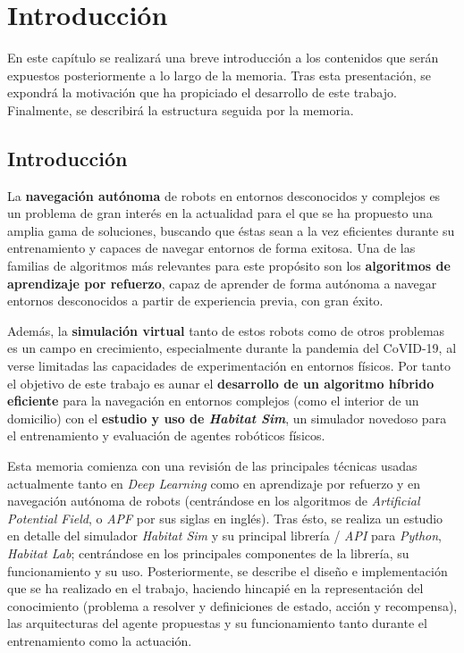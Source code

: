 \chapter{Introducción}

En este capítulo se realizará una breve introducción a los contenidos que serán expuestos posteriormente a lo largo de la memoria. Tras esta presentación, se expondrá la motivación que ha propiciado el desarrollo de este trabajo. Finalmente, se describirá la estructura seguida por la memoria.

\section{Introducción}

La \textbf{navegación autónoma} de robots en entornos desconocidos y complejos es un problema de gran interés en la actualidad para el que se ha propuesto una amplia gama de soluciones, buscando que éstas sean a la vez eficientes durante su entrenamiento y capaces de navegar entornos de forma exitosa. Una de las familias de algoritmos más relevantes para este propósito son los \textbf{algoritmos de aprendizaje por refuerzo}, capaz de aprender de forma autónoma a navegar entornos desconocidos a partir de experiencia previa, con gran éxito.

Además, la \textbf{simulación virtual} tanto de estos robots como de otros problemas es un campo en crecimiento, especialmente durante la pandemia del CoVID-19, al verse limitadas las capacidades de experimentación en entornos físicos.  Por tanto el objetivo de este trabajo es aunar el \textbf{desarrollo de un algoritmo híbrido eficiente} para la navegación en entornos complejos (como el interior de un domicilio) con el \textbf{estudio y uso de \textit{Habitat Sim}}, un simulador novedoso para el entrenamiento y evaluación de agentes robóticos físicos.

Esta memoria comienza con una revisión de las principales técnicas usadas actualmente tanto en \textit{Deep Learning} como en aprendizaje por refuerzo y en navegación autónoma de robots (centrándose en los algoritmos de \textit{Artificial Potential Field}, o \textit{APF} por sus siglas en inglés). Tras ésto, se realiza un estudio en detalle del simulador \textit{Habitat Sim} y su principal librería / \textit{API} para \textit{Python}, \textit{Habitat  Lab}; centrándose en los principales componentes de la librería, su funcionamiento y su uso. Posteriormente, se describe el diseño e implementación que se ha realizado en el trabajo, haciendo hincapié en la representación del conocimiento (problema a resolver y definiciones de estado, acción y recompensa), las arquitecturas del agente propuestas y su funcionamiento tanto durante el entrenamiento como la actuación. 


